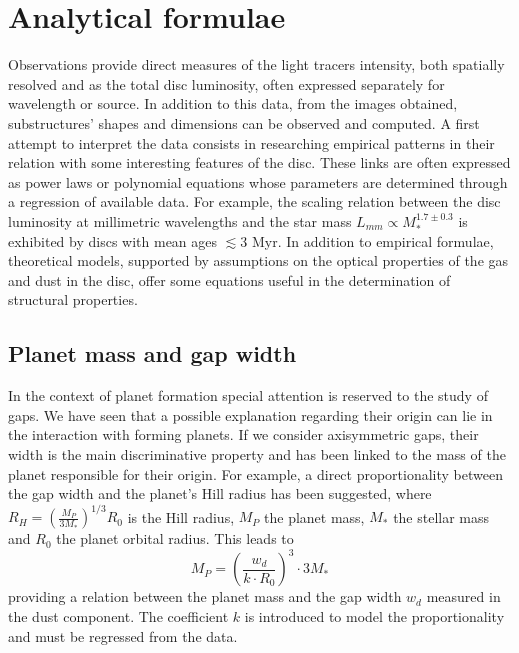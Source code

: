 \documentclass[a4paper,10pt]{report}
\begin{document}
\section{Analytical formulae}

Observations provide direct measures of the light tracers intensity, both spatially resolved and as
the total disc luminosity, often expressed separately for wavelength or source.
In addition to this data, from the images obtained, substructures' shapes and
dimensions can be observed and computed.
A first attempt to interpret the data consists in researching empirical patterns in their relation with some
interesting features of the disc. These links are often expressed as power laws or polynomial equations whose parameters are
determined through a regression of available data.
For example, the scaling relation between the disc luminosity at millimetric wavelengths and the star mass $L_{mm} \propto M_*^{1.7\pm0.3}$
is exhibited by discs with mean ages $\lesssim 3$ Myr.
In addition to empirical formulae, theoretical models, supported by assumptions on
the optical properties of the gas and dust in the disc, offer some equations useful
in the determination of structural properties.

\subsection{Planet mass and gap width}

In the context of planet formation special attention is reserved to the study of gaps. 
We have seen that a possible explanation regarding their origin can lie in the interaction with
forming planets. If we consider axisymmetric gaps, their width is the main discriminative property and
has been linked to the mass of the planet responsible for their origin.
For example, a direct proportionality between the gap width and the planet's Hill radius has been suggested, where
$
    R_H = (\frac{M_P}{3M_*})^{1/3}R_0
$
is the Hill radius, $M_P$ the planet mass, $M_*$ the stellar mass and $R_0$ the planet orbital radius.
This leads to 
\begin{equation}
    M_P = (\frac{w_d}{k\cdot R_0})^3\cdot 3M_*
\end{equation}
providing a relation between the planet mass and the gap width $w_d$ measured in the dust component.
The coefficient $k$ is introduced to model the proportionality and must be regressed from the data.
\end{document}
